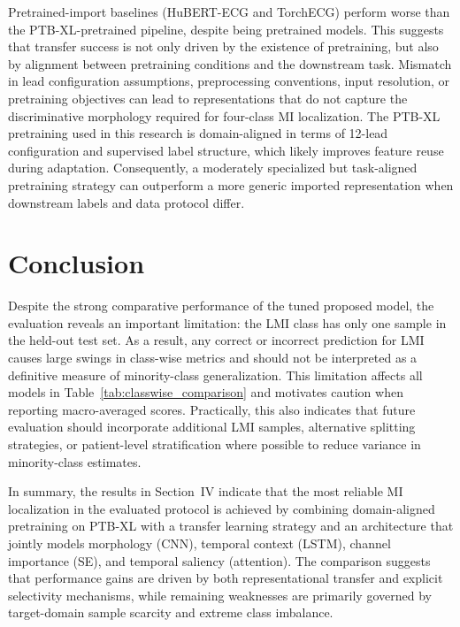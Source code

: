 \documentclass[preprint,12pt]{elsarticle}
\begin{document}
Pretrained-import baselines (HuBERT-ECG and TorchECG) perform worse than the PTB-XL-pretrained pipeline, despite being pretrained models. This suggests that transfer success is not only driven by the existence of pretraining, but also by alignment between pretraining conditions and the downstream task. Mismatch in lead configuration assumptions, preprocessing conventions, input resolution, or pretraining objectives can lead to representations that do not capture the discriminative morphology required for four-class MI localization. The PTB-XL pretraining used in this research is domain-aligned in terms of 12-lead configuration and supervised label structure, which likely improves feature reuse during adaptation. Consequently, a moderately specialized but task-aligned pretraining strategy can outperform a more generic imported representation when downstream labels and data protocol differ.
\section{Conclusion}

Despite the strong comparative performance of the tuned proposed model, the evaluation reveals an important limitation: the LMI class has only one sample in the held-out test set. As a result, any correct or incorrect prediction for LMI causes large swings in class-wise metrics and should not be interpreted as a definitive measure of minority-class generalization. This limitation affects all models in Table~\ref{tab:classwise_comparison} and motivates caution when reporting macro-averaged scores. Practically, this also indicates that future evaluation should incorporate additional LMI samples, alternative splitting strategies, or patient-level stratification where possible to reduce variance in minority-class estimates.

In summary, the results in Section~IV indicate that the most reliable MI localization in the evaluated protocol is achieved by combining domain-aligned pretraining on PTB-XL with a transfer learning strategy and an architecture that jointly models morphology (CNN), temporal context (LSTM), channel importance (SE), and temporal saliency (attention). The comparison suggests that performance gains are driven by both representational transfer and explicit selectivity mechanisms, while remaining weaknesses are primarily governed by target-domain sample scarcity and extreme class imbalance.




\end{document}
